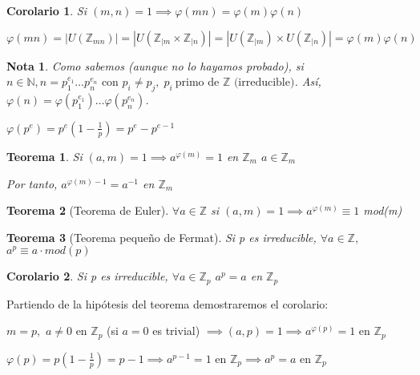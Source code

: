 \documentclass[11pt, a4paper, titlepage]{article}
\makeatletter
\renewenvironment{proof}[1][\proofname] {\vspace{-15pt}\par\pushQED{\qed}\normalfont\topsep6\p@\@plus6\p@\relax\trivlist\item[\hskip\labelsep\it#1\@addpunct{.}]\ignorespaces}{\popQED\endtrivlist\@endpefalse}
\theoremstyle{theorem-style}
\newtheorem*{nth}{Teorema}
\newtheorem{ncor}{Corolario}
\theoremstyle{definition-style}
\theoremstyle{remark-style}
\newtheorem*{nota}{Nota}
\theoremstyle{example-style}
\makeatother
\begin{document}
\begin{ncor}
  Si $(m,n) = 1 \implies \varphi(mn) = \varphi(m)\varphi(n)$
\end{ncor}

\begin{proof}
  $\varphi(mn) = |U(\mathbb{Z}_{mn})| = |U(\mathbb{Z}_{|m}\times\mathbb{Z}_{|n})| = |U(\mathbb{Z}_{|m}) \times U(\mathbb{Z}_{|n})| = \varphi(m)\varphi(n)$
\end{proof}
\begin{nota}
  Como sabemos (aunque no lo hayamos probado), si $n\in \mathbb{N}, n= p_1^{e_1}\dots p_n^{e_n} \text{ con } p_i \ne p_j,\; p_i\ \text{primo de $\mathbb{Z}$ (irreducible)}$. Así, $\varphi(n) = \varphi(p_1^{e_1})\dots\varphi(p_n^{e_n})$.
  
  $\varphi(p^e) = p^e(1-\frac{1}{p}) = p^e-p^{e-1}$
\end{nota}



\begin{nth}
	Si $(a,m)=1 \implies a^{\varphi(m)} = 1$ en $ \mathbb Z_{m}$ \hspace{0.5cm} $a \in \mathbb Z_{m} $

Por tanto, $ a^{\varphi(m)-1} = a^{-1} $ en $ \mathbb Z_{m} $

\end{nth}


\begin{nth}[Teorema de Euler]
	$ \forall a \in \mathbb Z $ si $(a,m) = 1 \implies a^{\varphi(m)} \equiv 1 $ mod(m)
\end{nth}


\begin{nth}[Teorema pequeño de Fermat]
	Si p es irreducible, $ \forall a \in \mathbb Z, $ $ a^{p} \equiv a \cdot mod(p) $ 
\end{nth}



\begin{ncor}
	Si p es irreducible, $ \forall a \in \mathbb Z_{p} $	 \hspace{0.25cm} $ a^{p} = a $ en $ \mathbb Z_{p} $
\end{ncor}


\begin{proof}
	Partiendo de la hipótesis del teorema demostraremos el corolario:

$ m = p, $ $ a \neq 0 $ en  $ \mathbb Z_{p}$ (si $a=0$ es trivial) $ \implies (a,p) = 1 \implies a^{\varphi(p)} = 1 $ en $ \mathbb Z_{p} $

$ \varphi(p) = p(1-\frac{1}{p}) = p-1 \implies a^{p-1} = 1 $ en $ \mathbb Z_{p} \implies a^p=a $ en $ \mathbb Z_{p} $
	
\end{proof}
\end{document}
